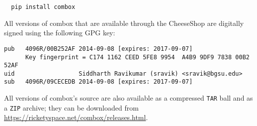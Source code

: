 \begin{verbatim}
  pip install combox
\end{verbatim}

All versions of combox that are available through the CheeseShop are
digitally signed using the following GPG key:

\begin{verbatim}
pub   4096R/00B252AF 2014-09-08 [expires: 2017-09-07]
      Key fingerprint = C174 1162 CEED 5FE8 9954  A4B9 9DF9 7838 00B2 52AF
uid                  Siddharth Ravikumar (sravik) <sravik@bgsu.edu>
sub   4096R/09CECEDB 2014-09-08 [expires: 2017-09-07]
\end{verbatim}

All versions of combox's source are also available as a compressed
\verb+TAR+ ball and as a \verb+ZIP+ archive; they can be downloaded
from \url{https://ricketyspace.net/combox/releases.html}.
